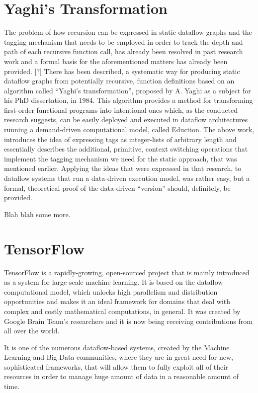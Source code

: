 \documentclass[ack,preface]{dithesis}
\begin{document}
    \section{Yaghi's Transformation}

The problem of how recursion can be expressed in static dataflow graphs and the tagging mechanism that needs to be employed in order to track the depth and path of each recursive function call, has already been resolved in past research work and a formal basis for the aforementioned matters has already been provided. [?]
There has been described, a systematic way for producing static dataflow graphs from potentially recursive, function definitions based on an algorithm called “Yaghi’s transformation”, proposed by A. Yaghi as a subject for his PhD dissertation, in 1984.
This algorithm provides a method for transforming first-order functional programs into intentional ones which, as the conducted research suggests, can be easily deployed and executed in dataflow architectures running a demand-driven computational model, called Eduction.
The above work, introduces the idea of expressing tags as integer-lists of arbitrary length and essentially describes the additional, primitive, context switching operations that implement the tagging mechanism we need for the static approach, that was mentioned earlier. Applying the ideas that were expressed in that research, to dataflow systems that run a data-driven execution model, was rather easy, but a formal, theoretical proof of the data-driven “version” should, definitely, be provided.

Blah blah some more.

    \section{TensorFlow}

TensorFlow is a rapidly-growing, open-sourced project that is mainly introduced as a system for large-scale machine learning. It is based on the dataflow computational model, which unlocks high parallelism and distribution opportunities and makes it an ideal framework for domains that deal with complex and costly mathematical computations, in general. It was created by Google Brain Team’s researchers and it is now being receiving contributions from all over the world. 

It is one of the numerous dataflow-based systems, created by the Machine Learning and Big Data communities, where they are in great need for new, sophisticated frameworks, that will allow them to fully exploit all of their resources in order to manage huge amount of data in a reasonable amount of time.
\end{document}
